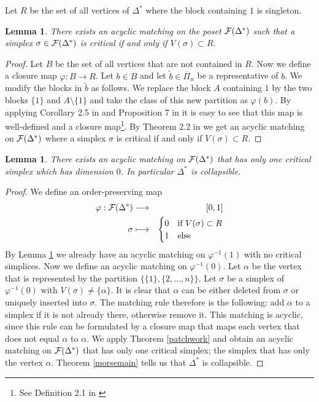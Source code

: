 \documentclass{elsarticle}
\newtheorem{lem}[df]{Lemma}
\begin{document}
Let $R$ be the set of all vertices of $\Delta^*$ where the block containing $1$ is singleton.
\begin{lem}
\label{simplclosure}
There exists an acyclic matching on the poset ${\cal F}(\Delta^*)$ such that a simplex $\sigma\in{\cal F}(\Delta^*)$ is critical if and only if  $V(\sigma)\subset R$.
\end{lem}
\begin{proof}
Let $B$ be the set of all vertices that are not contained in $R$. Now we define a closure map $\varphi:B\longrightarrow R$. Let $b\in B$ and let $\tilde b\in\overline{\Pi}_n$ be a representative of $b$. We modify the blocks in $\tilde b$ as follows. We replace the block $A$ containing $1$ by the two blocks $\{1\}$ and $A\setminus\{1\}$ and take the class of this new partition as $\varphi(b)$. By applying Corollary 2.5 in \cite{clmap} and Proposition 7 in \cite{jule} it is easy to see that this map is well-defined and a closure map\footnote{See Definition 2.1 in \cite{clmap}}. By Theorem 2.2 in \cite{clmap} we get an acyclic matching on ${\cal F}(\Delta^*)$ where a simplex $\sigma$ is critical if and only if  $V(\sigma)\subset R$.
\end{proof}
\begin{lem}
\label{mitte}
There exists an acyclic matching on ${\cal F}(\Delta^*)$ that has only one critical simplex which has dimension $0$. In particular $\Delta^*$ is collapsible.
\end{lem}
\begin{proof}
We define an order-preserving map
\begin{eqnarray*}
\varphi:{\cal F}(\Delta^*)&\longrightarrow&[0,1]\\
\sigma&\longmapsto&
\begin{cases}
0&\text{if $V(\sigma)\subset R$}\\
1&\text{else}
\end{cases}
\end{eqnarray*}
By Lemma \ref{simplclosure} we already have an acyclic matching on $\varphi^{-1}(1)$ with no critical simplices. Now we define an acyclic matching on $\varphi^{-1}(0)$. Let $\alpha$ be the vertex that is represented by the partition $\{\{1\},\{2,\dots,n\}\}$. Let $\sigma$ be a simplex of $\varphi^{-1}(0)$ with $V(\sigma)\not=\{\alpha\}$. It is clear that $\alpha$ can be either deleted from $\sigma$ or uniquely inserted into $\sigma$. The matching rule therefore is the following: add $\alpha$ to a simplex if it is not already there, otherwise remove it. This matching is acyclic, since this rule can be formulated by a closure map that maps each vertex that does not equal $\alpha$ to $\alpha$. We apply Theorem \ref{patchwork} and obtain an acyclic matching on ${\cal F}(\Delta^*)$ that has only one critical simplex; the simplex that has only the vertex $\alpha$. Theorem \ref{morsemain} tells us that $\Delta^*$ is collapsible.
\end{proof}
\end{document}
